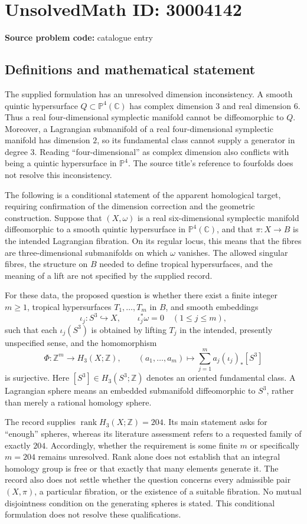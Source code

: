 \documentclass[11pt]{article}
\newcommand{\Z}{\mathbb{Z}}
\newcommand{\C}{\mathbb{C}}
\begin{document}
\section*{UnsolvedMath ID: 30004142}
\textbf{Source problem code:} catalogue entry
\subsection{Definitions and mathematical statement}
The supplied formulation has an unresolved dimension inconsistency. A smooth quintic hypersurface \(Q\subset\mathbb P^4(\C)\) has complex dimension \(3\) and real dimension \(6\). Thus a real four-dimensional symplectic manifold cannot be diffeomorphic to \(Q\). Moreover, a Lagrangian submanifold of a real four-dimensional symplectic manifold has dimension \(2\), so its fundamental class cannot supply a generator in degree \(3\). Reading ``four-dimensional'' as complex dimension also conflicts with being a quintic hypersurface in \(\mathbb P^4\). The source title's reference to fourfolds does not resolve this inconsistency.

\medskip
The following is a conditional statement of the apparent homological target, requiring confirmation of the dimension correction and the geometric construction. Suppose that \((X,\omega)\) is a real six-dimensional symplectic manifold diffeomorphic to a smooth quintic hypersurface in \(\mathbb P^4(\C)\), and that \(\pi:X\to B\) is the intended Lagrangian fibration. On its regular locus, this means that the fibres are three-dimensional submanifolds on which \(\omega\) vanishes. The allowed singular fibres, the structure on \(B\) needed to define tropical hypersurfaces, and the meaning of a lift are not specified by the supplied record.

For these data, the proposed question is whether there exist a finite integer \(m\geq 1\), tropical hypersurfaces \(T_1,\ldots,T_m\) in \(B\), and smooth embeddings
\[
\iota_j:S^3\hookrightarrow X,\qquad \iota_j^*\omega=0\quad(1\leq j\leq m),
\]
such that each \(\iota_j(S^3)\) is obtained by lifting \(T_j\) in the intended, presently unspecified sense, and the homomorphism
\[
\Phi:\Z^m\longrightarrow H_3(X;\Z),\qquad
(a_1,\ldots,a_m)\longmapsto
\sum_{j=1}^{m}a_j(\iota_j)_*[S^3]
\]
is surjective. Here \([S^3]\in H_3(S^3;\Z)\) denotes an oriented fundamental class. A Lagrangian sphere means an embedded submanifold diffeomorphic to \(S^3\), rather than merely a rational homology sphere.

The record supplies \(\operatorname{rank}H_3(X;\Z)=204\). Its main statement asks for ``enough'' spheres, whereas its literature assessment refers to a requested family of exactly \(204\). Accordingly, whether the requirement is some finite \(m\) or specifically \(m=204\) remains unresolved. Rank alone does not establish that an integral homology group is free or that exactly that many elements generate it. The record also does not settle whether the question concerns every admissible pair \((X,\pi)\), a particular fibration, or the existence of a suitable fibration. No mutual disjointness condition on the generating spheres is stated. This conditional formulation does not resolve these qualifications.
\end{document}
